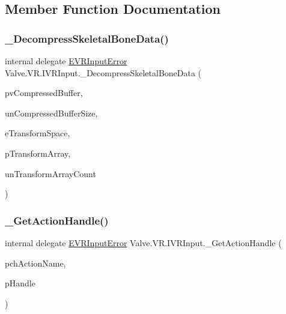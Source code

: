 \subsection{Member Function Documentation}
\mbox{\label{struct_valve_1_1_v_r_1_1_i_v_r_input_ae399aa93e9fa3f84762ce5e124b7c6fb}} 
\subsubsection{\texorpdfstring{\_DecompressSkeletalBoneData()}{\_DecompressSkeletalBoneData()}}
{\footnotesize\ttfamily internal delegate \mbox{\hyperlink{namespace_valve_1_1_v_r_a592d7f4189b8346d6c96dbdbaa35bc1b}{E\+V\+R\+Input\+Error}} Valve.\+V\+R.\+I\+V\+R\+Input.\+\_\+\+Decompress\+Skeletal\+Bone\+Data (\begin{DoxyParamCaption}\item[{Int\+Ptr}]{pv\+Compressed\+Buffer,  }\item[{uint}]{un\+Compressed\+Buffer\+Size,  }\item[{\mbox{\hyperlink{namespace_valve_1_1_v_r_a916744fb3fc7b8e8ba224fba9bee6de4}{E\+V\+R\+Skeletal\+Transform\+Space}}}]{e\+Transform\+Space,  }\item[{\mbox{[}\+In, Out\mbox{]} \mbox{\hyperlink{struct_valve_1_1_v_r_1_1_v_r_bone_transform__t}{V\+R\+Bone\+Transform\+\_\+t}} \mbox{[}$\,$\mbox{]}}]{p\+Transform\+Array,  }\item[{uint}]{un\+Transform\+Array\+Count }\end{DoxyParamCaption})}

\mbox{\label{struct_valve_1_1_v_r_1_1_i_v_r_input_a21380aa596ca906ff4b10666cf88065e}} 
\subsubsection{\texorpdfstring{\_GetActionHandle()}{\_GetActionHandle()}}
{\footnotesize\ttfamily internal delegate \mbox{\hyperlink{namespace_valve_1_1_v_r_a592d7f4189b8346d6c96dbdbaa35bc1b}{E\+V\+R\+Input\+Error}} Valve.\+V\+R.\+I\+V\+R\+Input.\+\_\+\+Get\+Action\+Handle (\begin{DoxyParamCaption}\item[{string}]{pch\+Action\+Name,  }\item[{ref ulong}]{p\+Handle }\end{DoxyParamCaption})}

